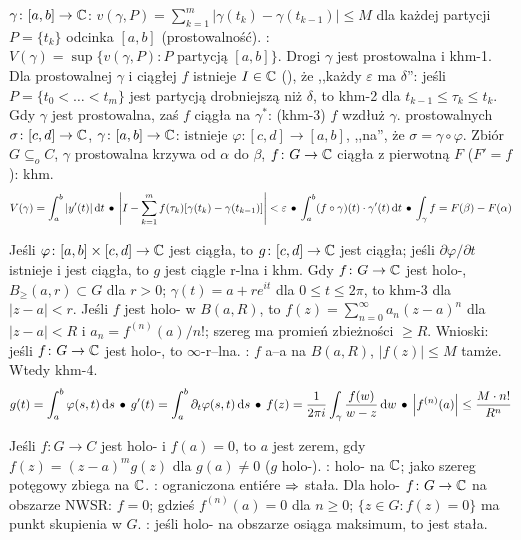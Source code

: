   $\gamma \colon [a,b] \to \mathbb{C}$:  $v(\gamma, P) = \sum_{k=1}^m |\gamma(t_k) - \gamma(t_{k-1})| \le M$ dla każdej partycji $P = \{t_k\}$ odcinka $[a,b]$ (prostowalność).
: $V(\gamma) = \sup \{v(\gamma, P) : P \text { partycją } [a,b]\}$.
Drogi $\gamma$ jest prostowalna i khm-1.
Dla prostowalnej $\gamma$ i ciągłej $f$ istnieje $I \in \mathbb{C}$ (), że ,,każdy $\varepsilon$ ma $\delta$'': jeśli $P = \{t_0 < \dots < t_m\}$ jest partycją drobniejszą niż $\delta$, to khm-2 dla $t_{k-1} \le \tau_k \le t_k$.
Gdy $\gamma$ jest prostowalna, zaś $f$ ciągła na $\gamma^*$:  (khm-3) $f$ wzdłuż $\gamma$.
 prostowalnych $\sigma \colon [c,d] \to \mathbb{C}$, $\gamma \colon [a,b] \to \mathbb{C}$: istnieje $\varphi \colon [c,d] \to [a,b]$, ,,na'', że $\sigma = \gamma \circ \varphi$.
Zbiór $G \subseteq_o C$, $\gamma$ prostowalna krzywa od $\alpha$ do $\beta$, $f \colon G \to \mathbb{C}$ ciągła z pierwotną $F$ ($F' = f$): khm.
\[
	V(\gamma) =  \int_a^b |y'(t)| \,\textrm{d} t \, \bullet \,
	\left| I - \sum_{k=1}^m f(\tau_k) [\gamma(t_k) - \gamma(t_{k-1})]\right| < \varepsilon \, \bullet \,
	\int_a^b (f \circ \gamma)(t) \cdot {\gamma'(t)} \,\textrm{d} t \, \bullet \,
	\int_\gamma f = F(\beta) - F(\alpha)
\]

Jeśli  $\varphi \colon [a,b] \times [c,d] \to \mathbb{C}$ jest ciągła, to $g \colon [c, d] \to \mathbb{C}$ jest ciągła; jeśli $\partial \varphi / \partial t$ istnieje i jest ciągła, to $g$ jest ciągle r-lna i khm.
Gdy $f \colon G \to \mathbb{C}$ jest holo-, $B_\ge(a, r) \subset G$ dla $r>0$; $\gamma(t) = a + r e^{it}$ dla $ 0 \le t \le 2\pi$, to khm-3 dla $|z-a| < r$.
Jeśli $f$ jest holo- w $B(a, R)$, to $f(z) = \sum_{n=0}^\infty a_n(z-a)^n$ dla $|z-a| < R$ i $a_n = f^{(n)}(a) / n!$; szereg ma promień zbieżności $\ge R$.
Wnioski: jeśli $f \colon G \to \mathbb{C}$ jest holo-, to $\infty$-r--lna.
: $f$ a--a na $B(a, R)$, $|f(z)| \le M$ tamże. Wtedy khm-4.
\[
	g(t) = \int_a^b \varphi(s, t) \,\textrm{d} s \, \bullet \,
	g'(t) = \int_a^b \partial_t \varphi (s,t) \,\textrm{d} s \, \bullet \,
	f(z)  =\frac{1}{2\pi i} \int_\gamma \frac{f(w)}{w-z} \,\textrm{d} w \, \bullet \,
	\left|f^{(n)}(a)\right| \le \frac{M \cdot n!}{R^n}
\]


Jeśli  $f \colon G \to C$ jest holo- i $f(a) = 0$, to $a$ jest  zerem, gdy $f(z) = (z-a)^m g(z)$ dla $g(a) \neq 0$ ($g$ holo-).
: holo- na $\mathbb{C}$; jako szereg potęgowy zbiega na $\mathbb{C}$.
: ograniczona entiére $\Rightarrow$ stała.
Dla holo- $f \colon G \to \mathbb{C}$ na obszarze NWSR: $f = 0$; gdzieś $f^{(n)} (a) = 0$ dla $n \ge 0$; $\{z \in G : f(z) = 0\}$ ma punkt skupienia w $G$.
: jeśli holo- na obszarze osiąga maksimum, to jest stała.


